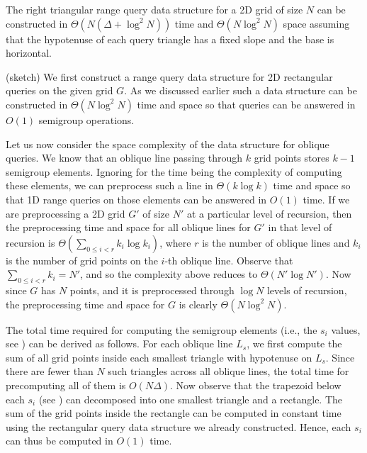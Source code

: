 \begin{theorem}
The right triangular range query data structure for a 2D grid of size
$N$ can be constructed in $\Theta( N(\Delta + \log^{2}{N}))$ time and
$\Theta( N \log^{2}{N} )$ space assuming that the hypotenuse of each
query triangle has a fixed slope and the base is horizontal.
\label{thm:rightTri}
\end{theorem}
%
\begin{IEEEproof}(sketch)
%
We first construct a range query data structure for 2D rectangular queries
on the given grid $G$. As we discussed earlier such a data structure can
be constructed in $\Theta( N \log^2{N})$ time and space so that queries
can be answered in $O(1)$ semigroup operations.

Let us now consider the space complexity of the data structure for
oblique queries. We know that an oblique line passing through $k$ grid
points stores $k - 1$ semigroup elements.  Ignoring for the time being
the complexity of computing these elements, we can preprocess such a
line in $\Theta( k \log{k} )$ time and space so that 1D range queries on
those elements can be answered in $O(1)$ time. If we are preprocessing
a 2D grid $G'$ of size $N'$ at a particular level of recursion, then
the preprocessing time and space for all oblique lines for $G'$ in that
level of recursion is $\Theta\left( \sum_{ 0 \leq i < r }{ k_i \log{k_i} }
\right)$, where $r$ is the number of oblique lines and $k_i$ is the number
of grid points on the $i$-th oblique line. Observe that $\sum_{ 0 \leq
i < r }{ k_i } = N'$, and so the complexity above reduces to $\Theta(
N' \log{N'} )$.  Now since $G$ has $N$ points, and it is preprocessed
through $\log{N}$ levels of recursion, the preprocessing time and space
for $G$ is clearly $\Theta( N \log^2{N} )$.

The total time required for computing the semigroup elements (i.e.,
the $s_i$ values, see ) can be derived as
follows. For each oblique line $L_s$, we first compute the sum of all
grid points inside each smallest triangle with hypotenuse on $L_s$. Since
there are fewer than $N$ such triangles across all oblique lines, the
total time for precomputing all of them is $O( N \Delta )$. Now observe
that the trapezoid below each $s_i$ (see )
can decomposed into one smallest triangle and a rectangle.  The sum of
the grid points inside the rectangle can be computed in constant time
using the rectangular query data structure we already constructed.
Hence, each $s_i$ can thus be computed in $O(1)$ time.
%
\end{IEEEproof}

